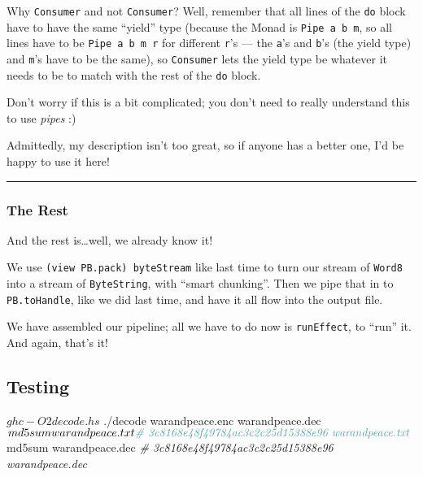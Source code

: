 \documentclass[]{article}
\newenvironment{Shaded}{}{}
\newcommand{\CommentTok}[1]{\textcolor[rgb]{0.38,0.63,0.69}{\textit{#1}}}
\newcommand{\ExtensionTok}[1]{#1}
\newcommand{\NormalTok}[1]{#1}
\begin{document}
Why \texttt{Consumer\textquotesingle{}} and not \texttt{Consumer}? Well,
remember that all lines of the \texttt{do} block have to have the same ``yield''
type (because the Monad is \texttt{Pipe\ a\ b\ m}, so all lines have to be
\texttt{Pipe\ a\ b\ m\ r} for different \texttt{r}'s --- the \texttt{a}'s and
\texttt{b}'s (the yield type) and \texttt{m}'s have to be the same), so
\texttt{Consumer\textquotesingle{}} lets the yield type be whatever it needs to
be to match with the rest of the \texttt{do} block.

Don't worry if this is a bit complicated; you don't need to really understand
this to use \emph{pipes} :)

Admittedly, my description isn't too great, so if anyone has a better one, I'd
be happy to use it here!

\begin{center}\rule{0.5\linewidth}{\linethickness}\end{center}

\hypertarget{the-rest}{%
\subsubsection{The Rest}\label{the-rest}}

And the rest is\ldots well, we already know it!

We use \texttt{(view\ PB.pack)\ byteStream} like last time to turn our stream of
\texttt{Word8} into a stream of \texttt{ByteString}, with ``smart chunking''.
Then we pipe that in to \texttt{PB.toHandle}, like we did last time, and have it
all flow into the output file.

We have assembled our pipeline; all we have to do now is \texttt{runEffect}, to
``run'' it. And again, that's it!

\hypertarget{testing}{%
\subsection{Testing}\label{testing}}

\begin{Shaded}
\begin{Highlighting}[]
\NormalTok{$ }\ExtensionTok{ghc}\NormalTok{ {-}O2 decode.hs}
\NormalTok{$ }\ExtensionTok{./decode}\NormalTok{ warandpeace.enc warandpeace.dec}
\NormalTok{$ }\ExtensionTok{md5sum}\NormalTok{ warandpeace.txt}
\CommentTok{\# 3c8168e48f49784ac3c2c25d15388e96  warandpeace.txt}
\NormalTok{$ }\ExtensionTok{md5sum}\NormalTok{ warandpeace.dec}
\CommentTok{\# 3c8168e48f49784ac3c2c25d15388e96  warandpeace.dec}
\end{Highlighting}
\end{Shaded}
\end{document}
